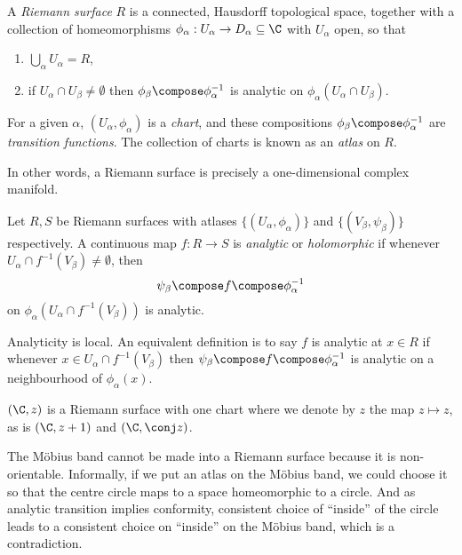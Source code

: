 \documentclass[a4paper]{article}
\begin{document}
\begin{definition}
  A \emph{Riemann surface} \(R\) is a connected, Hausdorff topological space, together with a collection of homeomorphisms \(\phi_\alpha: U_\alpha \to D_\alpha \subseteq \C\) with \(U_\alpha\) open, so that
  \begin{enumerate}
  \item \(\bigcup_{\alpha} U_\alpha = R\),
  \item if \(U_\alpha \cap U_\beta \neq \emptyset\) then \(\phi_\beta \compose \phi_\alpha^{-1}\) is analytic on \(\phi_\alpha(U_\alpha \cap U_\beta)\).
  \end{enumerate}

  For a given \(\alpha\), \((U_\alpha, \phi_\alpha)\) is a \emph{chart}, and these compositions \(\phi_\beta \compose \phi_\alpha^{-1}\) are \emph{transition functions}. The collection of charts is known as an \emph{atlas} on \(R\).
\end{definition}

In other words, a Riemann surface is precisely a one-dimensional complex manifold.

\begin{definition}
  Let \(R, S\) be Riemann surfaces with atlases \(\{(U_\alpha, \phi_\alpha)\}\) and \(\{(V_\beta, \psi_\beta)\}\) respectively. A continuous map \(f: R \to S\) is \emph{analytic} or \emph{holomorphic} if whenever \(U_\alpha \cap f^{-1}(V_\beta) \neq \emptyset\), then
  \[
    \psi_\beta \compose f \compose \phi_\alpha^{-1}
  \]
  on \(\phi_\alpha(U_\alpha \cap f^{-1}(V_\beta))\) is analytic.
\end{definition}

\begin{remark}
  Analyticity is local. An equivalent definition is to say \(f\) is analytic at \(x \in R\) if whenever \(x \in U_\alpha \cap f^{-1}(V_\beta)\) then \(\psi_\beta \compose f \compose \phi_\alpha^{-1}\) is analytic on a neighbourhood of \(\phi_\alpha(x)\).
\end{remark}

\begin{eg}
  \((\C, z)\) is a Riemann surface with one chart where we denote by \(z\) the map \(z \mapsto z\), as is \((\C, z + 1)\) and \((\C, \conj z)\).
\end{eg}

\begin{eg}
  The Möbius band cannot be made into a Riemann surface because it is non-orientable. Informally, if we put an atlas on the Möbius band, we could choose it so that the centre circle maps to a space homeomorphic to a circle. And as analytic transition implies conformity, consistent choice of ``inside'' of the circle leads to a consistent choice on ``inside'' on the Möbius band, which is a contradiction.
\end{eg}
\end{document}
